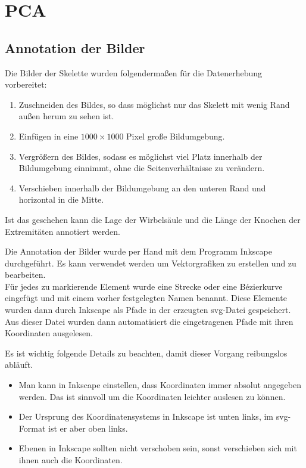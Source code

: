 \section{PCA}
\label{implementation_detail_pca}

\subsection{Annotation der Bilder}

Die Bilder der Skelette wurden folgendermaßen für die Datenerhebung vorbereitet:
 
 \begin{enumerate}
  \item Zuschneiden des Bildes, so dass möglichst nur das Skelett mit wenig Rand außen herum zu sehen ist.
  \item Einfügen in eine $1000 \times 1000$ Pixel große Bildumgebung.
  \item Vergrößern des Bildes, sodass es möglichst viel Platz innerhalb der Bildumgebung einnimmt, ohne die Seitenverhältnisse zu verändern.
  \item Verschieben innerhalb der Bildumgebung an den unteren Rand und horizontal in die Mitte.
 \end{enumerate}

 Ist das geschehen kann die Lage der Wirbelsäule und die Länge der Knochen der Extremitäten annotiert werden.
 
 \newpage
Die Annotation der Bilder wurde per Hand mit dem Programm Inkscape \cite{inkscape} durchgeführt. Es kann verwendet werden um Vektorgrafiken zu erstellen und zu bearbeiten.\\
Für jedes zu markierende Element wurde eine Strecke oder eine Bézierkurve eingefügt und mit einem vorher festgelegten Namen benannt. Diese Elemente wurden dann durch Inkscape als Pfade in der erzeugten svg-Datei gespeichert. Aus dieser Datei wurden dann automatisiert die eingetragenen Pfade mit ihren Koordinaten ausgelesen.

Es ist wichtig folgende Details zu beachten, damit dieser Vorgang reibungslos abläuft. 
\begin{itemize}
 \item Man kann in Inkscape einstellen, dass Koordinaten immer absolut angegeben werden. Das ist sinnvoll um die Koordinaten leichter auslesen zu können.
 \item Der Ursprung des Koordinatensystems in Inkscape ist unten links, im svg-Format ist er aber oben links.
 \item Ebenen in Inkscape sollten nicht verschoben sein, sonst verschieben sich mit ihnen auch die Koordinaten.  
\end{itemize}

